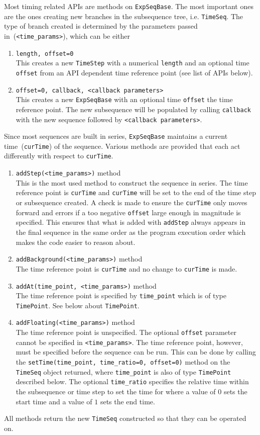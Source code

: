 Most timing related APIs are methods on \verb`ExpSeqBase`.
The most important ones are the ones creating new branches
in the subsequence tree, i.e. \verb`TimeSeq`.
The type of branch created is determined by the parameters passed in~(\verb`<time_params>`),
which can be either
\begin{enumerate}
\item \verb`length, offset=0`\\
  This creates a new \verb`TimeStep` with a numerical \verb`length`
  and an optional time \verb`offset` from an API dependent time reference point
  (see list of APIs below).
\item \verb`offset=0, callback, <callback parameters>`\\
  This creates a new \verb`ExpSeqBase` with an optional time \verb`offset`
  the time reference point.
  The new subsequence will be populated by calling \verb`callback`
  with the new sequence followed by \verb`<callback parameters>`.
\end{enumerate}
Since most sequences are built in series, \verb`ExpSeqBase` maintains
a current time~(\verb`curTime`) of the sequence.
Various methods are provided that each act differently with respect to \verb`curTime`.
\begin{enumerate}
\item \verb`addStep(<time_params>)` method\\
  This is the most used method to construct the sequence in series.
  The time reference point is \verb`curTime` and
  \verb`curTime` will be set to the end of the time step or subsequence created.
  A check is made to ensure the \verb`curTime` only moves forward and
  errors if a too negative \verb`offset` large enough in magnitude is specified.
  This ensures that what is added with \verb`addStep` always appears in the final
  sequence in the same order as the program execution order
  which makes the code easier to reason about.
\item \verb`addBackground(<time_params>)` method\\
  The time reference point is \verb`curTime` and no change to \verb`curTime` is made.
\item \verb`addAt(time_point, <time_params>)` method\\
  The time reference point is specified by \verb`time_point` which is of type \verb`TimePoint`.
  See below about \verb`TimePoint`.
\item \verb`addFloating(<time_params>)` method\\
  The time reference point is unspecified.
  The optional \verb`offset` parameter cannot be specified in \verb`<time_params>`.
  The time reference point, however, must be specified before the sequence can be run.
  This can be done by calling the \verb`setTime(time_point, time_ratio=0, offset=0)` method
  on the \verb`TimeSeq` object returned,
  where \verb`time_point` is also of type \verb`TimePoint` described below.
  The optional \verb`time_ratio` specifies the relative time within the subsequence
  or time step to set the time for where a value of $0$ sets the start time
  and a value of $1$ sets the end time.
\end{enumerate}
All methods return the new \verb`TimeSeq` constructed so that they can be operated on.

